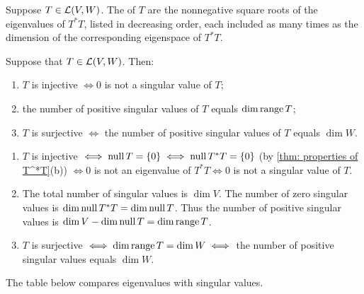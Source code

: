 \begin{mydef}
  Suppose $T \in \mathcal{L} (V,W)$. The  of $T$ are the nonnegative square roots of the eigenvalues of $T^*T$, listed in decreasing order, each included as many times as the dimension of the corresponding eigenspace of $T^*T$.
\end{mydef}

\begin{thm}
  \label{thm: role of positive singular values}
  Suppose that $T\in \mathcal{L} (V,W)$. Then:
  \begin{enumerate} [label=\textbf{(\alph*)}]
    \item $T$ is injective $\iff 0$ is not a singular value of $T$;
    \item the number of positive singular values of $T$ equals $\dim \operatorname{range} T$;
    \item $T$ is surjective $\iff$ the number of positive singular values of $T$ equals $\dim W$.
  \end{enumerate}
\end{thm}
\begin{prf}
  \begin{enumerate}[label=\textbf{(\alph*)}]
    \item $T$ is injective $\iff \operatorname{null} T = \{0\} \iff \operatorname{null} T^*T = \{0\}$ (by \ref{thm: properties of T^*T}(b)) $\iff 0$ is not an eigenvalue of $T^*T \iff 0$ is not a singular value of $T$.
    \item The total number of singular values is $\dim V$. The number of zero singular values is $\dim \operatorname{null} T^*T = \dim \operatorname{null} T$. Thus the number of positive singular values is $\dim V - \dim \operatorname{null} T = \dim \operatorname{range} T$.
    \item $T$ is surjective $\iff \dim \operatorname{range} T = \dim W \iff$ the number of positive singular values equals $\dim W$.
  \end{enumerate}
  \vspace{-\baselineskip}
\end{prf}

The table below compares eigenvalues with singular values.

